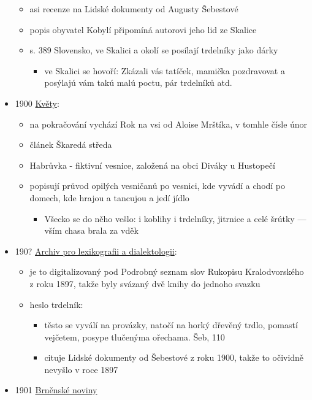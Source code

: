 \begin{itemize}
  \begin{itemize}
  \tightlist
  \item
    asi recenze na Lidské dokumenty od Augusty Šebestové
  \item
    popis obyvatel Kobylí připomíná autorovi jeho lid ze Skalice
  \item
    s. 389 Slovensko, ve Skalici a okolí se posílají trdelníky jako
    dárky

    \begin{itemize}
    \tightlist
    \item
      ve Skalici se hovoří: Zkázali vás tatíček, mamička pozdravovat a
      posýlajú vám takú malú poctu, pár trdelníků atd.
    \end{itemize}
  \end{itemize}
\item
  1900
  \href{https://ceskadigitalniknihovna.cz/uuid/uuid:24bda940-8ab0-11ed-8f7f-5ef3fc9bb22f}{Květy}:

  \begin{itemize}
  \tightlist
  \item
    na pokračování vychází Rok na vsi od Aloise Mrštíka, v tomhle čísle
    únor
  \item
    článek Škaredá středa
  \item
    Habrůvka - fiktivní vesnice, založená na obci Diváky u Hustopečí
  \item
    popisují průvod opilých vesničanů po vesnici, kde vyvádí a chodí po
    domech, kde hrajou a tancujou a jedí jídlo

    \begin{itemize}
    \tightlist
    \item
      Všecko se do něho vešlo: i koblihy i trdelníky, jitrnice a celé
      šrútky --- vším chasa brala za vděk
    \end{itemize}
  \end{itemize}
\item
  190?
  \href{https://ceskadigitalniknihovna.cz/uuid/uuid:225c96bf-3ac7-4d81-addb-3ab9562be388}{Archiv
  pro lexikografii a dialektologii}:

  \begin{itemize}
  \tightlist
  \item
    je to digitalizovaný pod Podrobný seznam slov Rukopisu
    Kralodvorského z roku 1897, takže byly svázaný dvě knihy do jednoho
    svazku
  \item
    heslo trdelník:

    \begin{itemize}
    \tightlist
    \item
      těsto se vyválí na provázky, natočí na horký dřevěný trdlo,
      pomastí vejčetem, posype tlučenýma ořechama. Šeb, 110
    \item
      cituje Lidské dokumenty od Šebestové z roku 1900, takže to
      očividně nevyšlo v roce 1897
    \end{itemize}
  \end{itemize}
\item
  1901
  \href{https://ndk.cz/view/uuid:c714e5a0-81eb-11e3-a70e-005056822549?page=uuid\%3A884b7690-8641-11e3-b315-001018b5eb5c&fulltext=trdeln\%C3\%ADky}{Brněnské
  noviny}


\end{itemize}
